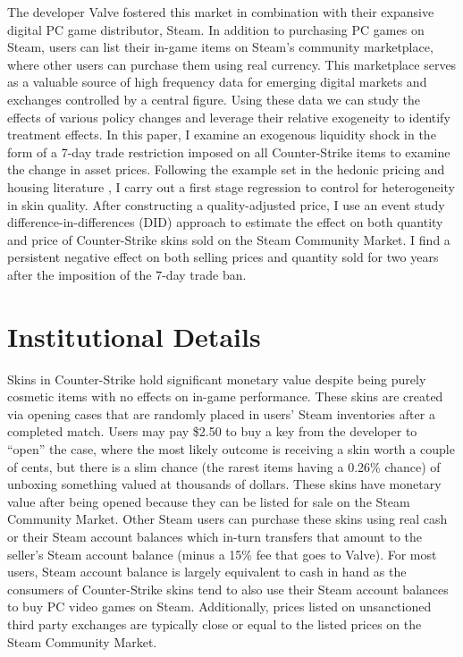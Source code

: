 \documentclass[12pt,letterpaper]{article}
\begin{document}
The developer Valve fostered this market in combination with their expansive digital PC game distributor, Steam. In addition to purchasing PC games on Steam, users can list their in-game items on Steam's community marketplace, where other users can purchase them using real currency. This marketplace serves as a valuable source of high frequency data for emerging digital markets and exchanges controlled by a central figure. Using these data we can study the effects of various policy changes and leverage their relative exogeneity to identify treatment effects. In this paper, I examine an exogenous liquidity shock in the form of a 7-day trade restriction imposed on all Counter-Strike items to examine the change in asset prices. Following the example set in the hedonic pricing and housing literature \parencites{lancaster_1966}{rosen_1974}{rosen1986}{sirmans_2005}, I carry out a first stage regression to control for heterogeneity in skin quality. After constructing a quality-adjusted price, I use an event study difference-in-differences (DID) approach to estimate the effect on both quantity and price of Counter-Strike skins sold on the Steam Community Market. I find a persistent negative effect on both selling prices and quantity sold for two years after the imposition of the 7-day trade ban. \\

\section{Institutional Details}
Skins in Counter-Strike hold significant monetary value despite being purely cosmetic items with no effects on in-game performance. These skins are created via opening cases that are randomly placed in users' Steam inventories after a completed match. Users may pay \$2.50 to buy a key from the developer to ``open'' the case, where the most likely outcome is receiving a skin worth a couple of cents, but there is a slim chance (the rarest items having a 0.26\% chance) of unboxing something valued at thousands of dollars. These skins have monetary value after being opened because they can be listed for sale on the Steam Community Market. Other Steam users can purchase these skins using real cash or their Steam account balances which in-turn transfers that amount to the seller's Steam account balance (minus a 15\% fee that goes to Valve). For most users, Steam account balance is largely equivalent to cash in hand as the consumers of Counter-Strike skins tend to also use their Steam account balances to buy PC video games on Steam. Additionally, prices listed on unsanctioned third party exchanges are typically close or equal to the listed prices on the Steam Community Market. \\
\end{document}
